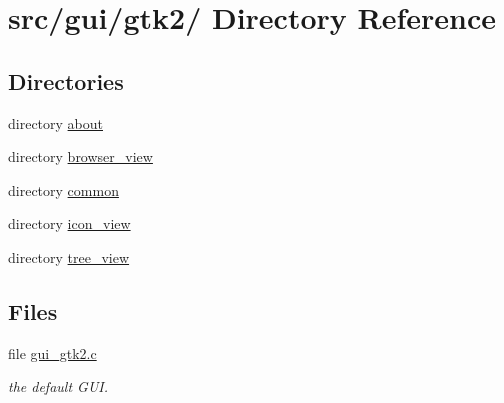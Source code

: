 \hypertarget{dir_000002}{
\section{src/gui/gtk2/ Directory Reference}
\label{dir_000002}
}
\subsection*{Directories}
\begin{CompactItemize}
\item 
directory \hyperlink{dir_000003}{about}
\item 
directory \hyperlink{dir_000014}{browser\_\-view}
\item 
directory \hyperlink{dir_000004}{common}
\item 
directory \hyperlink{dir_000026}{icon\_\-view}
\item 
directory \hyperlink{dir_000046}{tree\_\-view}
\end{CompactItemize}
\subsection*{Files}
\begin{CompactItemize}
\item 
file \hyperlink{gui__gtk2_8c}{gui\_\-gtk2.c}
\begin{CompactList}\small\item\em the default GUI. \item\end{CompactList}

\end{CompactItemize}
